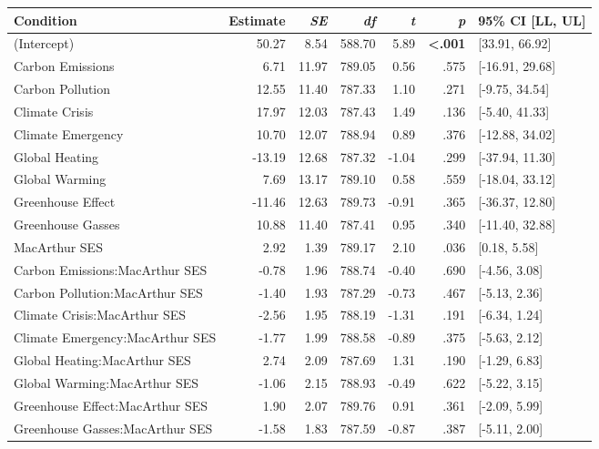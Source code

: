 \begin{table}[ht]
\centering
\begin{tabular}{lrrrrrl}
  \hline
Condition & Estimate & \textit{SE} & \textit{df} & \textit{t} & \textit{p} & 95\% CI [LL, UL] \\ 
  \hline
(Intercept) & 50.27 & 8.54 & 588.70 & 5.89 & \textbf{\textless  .001} & [33.91, 66.92] \\ 
  Carbon Emissions & 6.71 & 11.97 & 789.05 & 0.56 & .575 & [-16.91, 29.68] \\ 
  Carbon Pollution & 12.55 & 11.40 & 787.33 & 1.10 & .271 & [-9.75, 34.54] \\ 
  Climate Crisis & 17.97 & 12.03 & 787.43 & 1.49 & .136 & [-5.40, 41.33] \\ 
  Climate Emergency & 10.70 & 12.07 & 788.94 & 0.89 & .376 & [-12.88, 34.02] \\ 
  Global Heating & -13.19 & 12.68 & 787.32 & -1.04 & .299 & [-37.94, 11.30] \\ 
  Global Warming & 7.69 & 13.17 & 789.10 & 0.58 & .559 & [-18.04, 33.12] \\ 
  Greenhouse Effect & -11.46 & 12.63 & 789.73 & -0.91 & .365 & [-36.37, 12.80] \\ 
  Greenhouse Gasses & 10.88 & 11.40 & 787.41 & 0.95 & .340 & [-11.40, 32.88] \\ 
  MacArthur SES & 2.92 & 1.39 & 789.17 & 2.10 & .036 & [0.18, 5.58] \\ 
  Carbon Emissions:MacArthur SES & -0.78 & 1.96 & 788.74 & -0.40 & .690 & [-4.56, 3.08] \\ 
  Carbon Pollution:MacArthur SES & -1.40 & 1.93 & 787.29 & -0.73 & .467 & [-5.13, 2.36] \\ 
  Climate Crisis:MacArthur SES & -2.56 & 1.95 & 788.19 & -1.31 & .191 & [-6.34, 1.24] \\ 
  Climate Emergency:MacArthur SES & -1.77 & 1.99 & 788.58 & -0.89 & .375 & [-5.63, 2.12] \\ 
  Global Heating:MacArthur SES & 2.74 & 2.09 & 787.69 & 1.31 & .190 & [-1.29, 6.83] \\ 
  Global Warming:MacArthur SES & -1.06 & 2.15 & 788.93 & -0.49 & .622 & [-5.22, 3.15] \\ 
  Greenhouse Effect:MacArthur SES & 1.90 & 2.07 & 789.76 & 0.91 & .361 & [-2.09, 5.99] \\ 
  Greenhouse Gasses:MacArthur SES & -1.58 & 1.83 & 787.59 & -0.87 & .387 & [-5.11, 2.00] \\ 
   \hline
\end{tabular}
\end{table}
